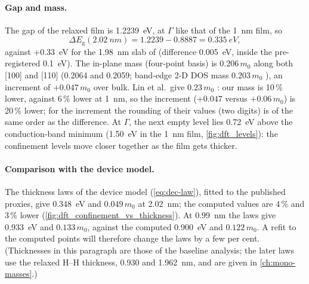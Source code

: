\paragraph{Gap and mass.} The gap of the relaxed film is 1.2239~eV, at $\Gamma$ like that of the 1~nm film, so
\begin{equation}
\Delta E_{\mathrm{g}}(\SI{2.02}{nm}) = 1.2239 - 0.8887 = \SI{0.335}{eV},
\label{eq:dft-deg2}
\end{equation}
against $+0.33$~eV for the 1.98~nm slab of \citet[p.~21542]{Lin2022} (difference 0.005~eV, inside the pre-registered
0.1~eV). The in-plane mass (four-point basis) is $0.206\,m_0$ along both [100] and [110] (0.2064 and 0.2059; band-edge 2-D DOS
mass $0.203\,m_0$ ), an increment of
$+0.047\,m_0$ over bulk. Lin et al.\ give $0.23\,m_0$ \citep[p.~21540]{Lin2022}: our mass is 10\,\% lower, against
6\,\% lower at 1~nm, so the increment ($+0.047$ versus $+0.06\,m_0$) is 20\,\% lower; for the increment the rounding of
their values (two digits) is of the same order as the difference. At $\Gamma$, the next empty level lies 0.72~eV above
the conduction-band minimum (1.50~eV in the 1~nm film, \cref{fig:dft_levels}): the confinement levels move closer
together as the film gets thicker.

\paragraph{Comparison with the device model.} The thickness laws of the device model (\cref{eq:dec-law}), fitted to
the published proxies, give 0.348~eV and $0.049\,m_0$ at 2.02~nm; the computed values are 4\,\% and 3\,\% lower
(\cref{fig:dft_confinement_vs_thickness}). At 0.99~nm the laws give 0.933~eV and $0.133\,m_0$, against the computed 0.900~eV
and $0.122\,m_0$. A refit to the computed points will therefore change the laws by a few per cent. (Thicknesses in
this paragraph are those of the baseline analysis; the later laws use the relaxed H--H thickness, 0.930 and 1.962~nm,
and are given in \cref{ch:mono-masses}.)

